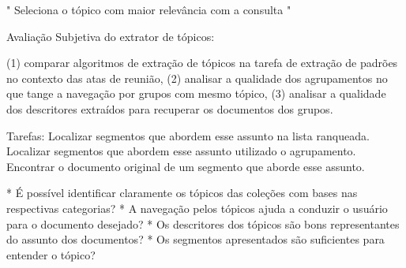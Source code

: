 " Seleciona o tópico com maior relevância com a consulta "












Avaliação Subjetiva do extrator de tópicos:

(1) comparar algoritmos de extração de tópicos na tarefa de extração de padrões no contexto das atas de reunião, (2) analisar a qualidade dos agrupamentos no que tange a navegação por grupos com mesmo tópico, (3) analisar a qualidade dos descritores extraídos para recuperar os documentos dos grupos.


Tarefas:
Localizar segmentos que abordem esse assunto na lista ranqueada.
Localizar segmentos que abordem esse assunto utilizado o agrupamento.
Encontrar o documento original de um segmento que aborde esse assunto.

* É possível identificar claramente os tópicos das coleções com bases nas respectivas categorias?
* A navegação pelos tópicos ajuda a conduzir o usuário para o documento desejado?
* Os descritores dos tópicos são bons representantes do assunto dos documentos?
* Os segmentos apresentados são suficientes para entender o tópico?




